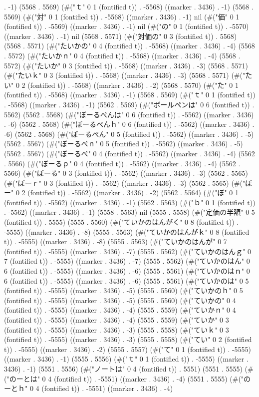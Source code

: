 . -1) (5568 . 5569) (#("ｔ" 0 1 (fontified t)) . -5568) ((marker . 3436) . -1) (5568 . 5569) (#("対" 0 1 (fontified t)) . -5568) ((marker . 3436) . -1) nil (#("価" 0 1 (fontified t)) . -5569) ((marker . 3436) . -1) nil (#("の" 0 1 (fontified t)) . -5570) ((marker . 3436) . -1) nil (5568 . 5571) (#("対価の" 0 3 (fontified t)) . 5568) (5568 . 5571) (#("たいかの" 0 4 (fontified t)) . -5568) ((marker . 3436) . -4) (5568 . 5572) (#("たいかｎ" 0 4 (fontified t)) . -5568) ((marker . 3436) . -4) (5568 . 5572) (#("たいか" 0 3 (fontified t)) . -5568) ((marker . 3436) . -3) (5568 . 5571) (#("たいｋ" 0 3 (fontified t)) . -5568) ((marker . 3436) . -3) (5568 . 5571) (#("たい" 0 2 (fontified t)) . -5568) ((marker . 3436) . -2) (5568 . 5570) (#("た" 0 1 (fontified t)) . -5568) ((marker . 3436) . -1) (5568 . 5569) (#("ｔ" 0 1 (fontified t)) . -5568) ((marker . 3436) . -1) (5562 . 5569) (#("ボールペンは" 0 6 (fontified t)) . 5562) (5562 . 5568) (#("ぼーるぺんは" 0 6 (fontified t)) . -5562) ((marker . 3436) . -6) (5562 . 5568) (#("ぼーるぺんｈ" 0 6 (fontified t)) . -5562) ((marker . 3436) . -6) (5562 . 5568) (#("ぼーるぺん" 0 5 (fontified t)) . -5562) ((marker . 3436) . -5) (5562 . 5567) (#("ぼーるぺｎ" 0 5 (fontified t)) . -5562) ((marker . 3436) . -5) (5562 . 5567) (#("ぼーるぺ" 0 4 (fontified t)) . -5562) ((marker . 3436) . -4) (5562 . 5566) (#("ぼーるｐ" 0 4 (fontified t)) . -5562) ((marker . 3436) . -4) (5562 . 5566) (#("ぼーる" 0 3 (fontified t)) . -5562) ((marker . 3436) . -3) (5562 . 5565) (#("ぼーｒ" 0 3 (fontified t)) . -5562) ((marker . 3436) . -3) (5562 . 5565) (#("ぼー" 0 2 (fontified t)) . -5562) ((marker . 3436) . -2) (5562 . 5564) (#("ぼ" 0 1 (fontified t)) . -5562) ((marker . 3436) . -1) (5562 . 5563) (#("ｂ" 0 1 (fontified t)) . -5562) ((marker . 3436) . -1) (5558 . 5563) nil (5555 . 5558) (#("定価の半額" 0 5 (fontified t)) . 5555) (5555 . 5560) (#("ていかのはんがく" 0 8 (fontified t)) . -5555) ((marker . 3436) . -8) (5555 . 5563) (#("ていかのはんがｋ" 0 8 (fontified t)) . -5555) ((marker . 3436) . -8) (5555 . 5563) (#("ていかのはんが" 0 7 (fontified t)) . -5555) ((marker . 3436) . -7) (5555 . 5562) (#("ていかのはんｇ" 0 7 (fontified t)) . -5555) ((marker . 3436) . -7) (5555 . 5562) (#("ていかのはん" 0 6 (fontified t)) . -5555) ((marker . 3436) . -6) (5555 . 5561) (#("ていかのはｎ" 0 6 (fontified t)) . -5555) ((marker . 3436) . -6) (5555 . 5561) (#("ていかのは" 0 5 (fontified t)) . -5555) ((marker . 3436) . -5) (5555 . 5560) (#("ていかのｈ" 0 5 (fontified t)) . -5555) ((marker . 3436) . -5) (5555 . 5560) (#("ていかの" 0 4 (fontified t)) . -5555) ((marker . 3436) . -4) (5555 . 5559) (#("ていかｎ" 0 4 (fontified t)) . -5555) ((marker . 3436) . -4) (5555 . 5559) (#("ていか" 0 3 (fontified t)) . -5555) ((marker . 3436) . -3) (5555 . 5558) (#("ていｋ" 0 3 (fontified t)) . -5555) ((marker . 3436) . -3) (5555 . 5558) (#("てい" 0 2 (fontified t)) . -5555) ((marker . 3436) . -2) (5555 . 5557) (#("て" 0 1 (fontified t)) . -5555) ((marker . 3436) . -1) (5555 . 5556) (#("ｔ" 0 1 (fontified t)) . -5555) ((marker . 3436) . -1) (5551 . 5556) (#("ノートは" 0 4 (fontified t)) . 5551) (5551 . 5555) (#("のーとは" 0 4 (fontified t)) . -5551) ((marker . 3436) . -4) (5551 . 5555) (#("のーとｈ" 0 4 (fontified t)) . -5551) ((marker . 3436) . -4) 
